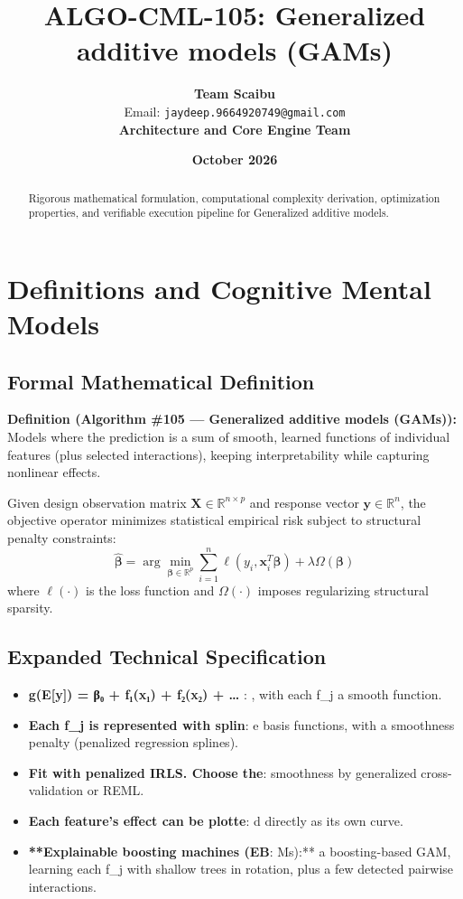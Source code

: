 \documentclass[11pt,a4paper]{article}
\title{\textbf{ALGO-CML-105: Generalized additive models (GAMs)}}
\author{\textbf{Team Scaibu} \\ \small Email: \texttt{jaydeep.9664920749@gmail.com} \\ \small \textbf{Architecture and Core Engine Team}}
\date{\textbf{October 2026}}
\theoremstyle{definition}
\begin{document}
\maketitle

\begin{abstract}
Rigorous mathematical formulation, computational complexity derivation, optimization properties, and verifiable execution pipeline for Generalized additive models.
\end{abstract}

\section{Definitions and Cognitive Mental Models}

\subsection{Formal Mathematical Definition}
\textbf{Definition (Algorithm \#105 --- Generalized additive models (GAMs)):}
Models where the prediction is a sum of smooth, learned functions of individual features (plus selected interactions), keeping interpretability while capturing nonlinear effects.

Given design observation matrix $\mathbf{X} \in \mathbb{R}^{n \times p}$ and response vector $\mathbf{y} \in \mathbb{R}^n$, the objective operator minimizes statistical empirical risk subject to structural penalty constraints:
\begin{equation}
\hat{\boldsymbol{\beta}} = \arg\min_{\boldsymbol{\beta} \in \mathbb{R}^p} \sum_{i=1}^n \ell(y_i, \mathbf{x}_i^T \boldsymbol{\beta}) + \lambda \Omega(\boldsymbol{\beta})
\end{equation}
where $\ell(\cdot)$ is the loss function and $\Omega(\cdot)$ imposes regularizing structural sparsity.

\subsection{Expanded Technical Specification}
\begin{itemize}
\item \textbf{g(E[y]) = β₀ + f₁(x₁) + f₂(x₂) + … }: , with each f\_j a smooth function.
\item \textbf{Each f\_j is represented with splin}: e basis functions, with a smoothness penalty (penalized regression splines).
\item \textbf{Fit with penalized IRLS. Choose the}:  smoothness by generalized cross-validation or REML.
\item \textbf{Each feature's effect can be plotte}: d directly as its own curve.
\item \textbf{**Explainable boosting machines (EB}: Ms):** a boosting-based GAM, learning each f\_j with shallow trees in rotation, plus a few detected pairwise interactions.
\end{itemize}
\end{document}
